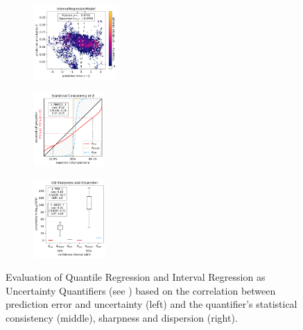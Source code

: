 \begin{figure}[H]
    \begin{subfigure}
    \centering
    \includegraphics[width=0.351\textwidth,valign=t]{uncertainty/figures/uq.intervalregressionmodel-correlation.pdf}
    \end{subfigure}
    \begin{subfigure}
    \centering
    \includegraphics[width=0.296\textwidth,valign=t]{uncertainty/figures/uq.intervalregressionmodel-consistency.pdf}
    \end{subfigure}
    \begin{subfigure}
    \centering
    \includegraphics[width=0.303\textwidth,valign=t]{uncertainty/figures/uq.intervalregressionmodel-sharpness.pdf}
    \end{subfigure}
   
    \vspace{-1em}
    \caption[Evaluation of Quantile and Interval Regression as Uncertainty Quantifiers]{Evaluation of Quantile Regression \cite{regression-quantiles-1978, deep-quantiles-2022} and Interval Regression \cite{interval-minimisation-2018} as Uncertainty Quantifiers (see ) based on the correlation between prediction error and uncertainty (left) and the quantifier's statistical consistency (middle), sharpness and dispersion (right).}
    \label{fig:uncertainty-quantile-interval}
\end{figure}

